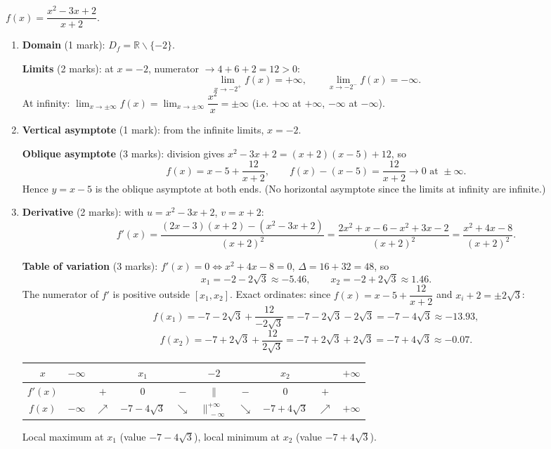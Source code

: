 \documentclass[11pt]{article}
\def\setminus{\mathbin{\backslash}}\let\smallsetminus\setminus
\begin{document}
\begin{corrige}
$f(x)=\dfrac{x^{2}-3x+2}{x+2}$.

\begin{enumerate}
\item \textbf{Domain} (1 mark): $D_f=\mathbb{R}\setminus\{-2\}$.

\textbf{Limits} (2 marks): at $x=-2$, numerator $\to 4+6+2=12>0$:
\[ \lim_{x\to -2^{+}}f(x)=+\infty, \qquad \lim_{x\to -2^{-}}f(x)=-\infty. \]
At infinity: $\lim_{x\to\pm\infty}f(x)=\lim_{x\to\pm\infty}\dfrac{x^{2}}{x}=\pm\infty$ (i.e. $+\infty$ at $+\infty$, $-\infty$ at $-\infty$).

\item \textbf{Vertical asymptote} (1 mark): from the infinite limits, $x=-2$.

\textbf{Oblique asymptote} (3 marks): division gives $x^{2}-3x+2=(x+2)(x-5)+12$, so
\[ f(x)=x-5+\frac{12}{x+2}, \qquad f(x)-(x-5)=\frac{12}{x+2}\to 0 \text{ at } \pm\infty. \]
Hence $y=x-5$ is the oblique asymptote at both ends. (No horizontal asymptote since the limits at infinity are infinite.)

\item \textbf{Derivative} (2 marks): with $u=x^{2}-3x+2$, $v=x+2$:
\[ f'(x)=\frac{(2x-3)(x+2)-(x^{2}-3x+2)}{(x+2)^{2}}=\frac{2x^{2}+x-6-x^{2}+3x-2}{(x+2)^{2}}=\frac{x^{2}+4x-8}{(x+2)^{2}}. \]

\textbf{Table of variation} (3 marks): $f'(x)=0 \iff x^{2}+4x-8=0$, $\Delta=16+32=48$, so
\[ x_{1}=-2-2\sqrt{3}\approx -5.46, \qquad x_{2}=-2+2\sqrt{3}\approx 1.46. \]
The numerator of $f'$ is positive outside $[x_1,x_2]$. Exact ordinates: since $f(x)=x-5+\dfrac{12}{x+2}$ and $x_i+2=\pm 2\sqrt{3}$:
\[ f(x_{1})=-7-2\sqrt{3}+\frac{12}{-2\sqrt{3}}=-7-2\sqrt{3}-2\sqrt{3}=-7-4\sqrt{3}\approx -13.93, \]
\[ f(x_{2})=-7+2\sqrt{3}+\frac{12}{2\sqrt{3}}=-7+2\sqrt{3}+2\sqrt{3}=-7+4\sqrt{3}\approx -0.07. \]
\begin{center}
\begin{tabular}{|c|ccccccccc|}
\hline
$x$ & $-\infty$ & & $x_{1}$ & & $-2$ & & $x_{2}$ & & $+\infty$ \\
\hline
$f'(x)$ & & $+$ & $0$ & $-$ & $\|$ & $-$ & $0$ & $+$ & \\
\hline
$f(x)$ & $-\infty$ & $\nearrow$ & $-7-4\sqrt{3}$ & $\searrow$ & $\|_{\ -\infty}^{+\infty}$ & $\searrow$ & $-7+4\sqrt{3}$ & $\nearrow$ & $+\infty$ \\
\hline
\end{tabular}
\end{center}
Local maximum at $x_1$ (value $-7-4\sqrt3$), local minimum at $x_2$ (value $-7+4\sqrt3$).


\end{enumerate}
\end{corrige}
\end{document}
